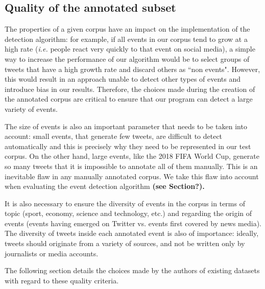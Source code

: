 \subsection{Quality of the annotated subset}

The properties of a given corpus have an impact on the implementation of the detection algorithm: for example, if all events in our corpus tend to grow at a high rate (\textit{i.e.} people react very quickly to that event on social media), a simple way to increase the performance of our algorithm would be to select groups of tweets that have a high growth rate and discard others as ``non events". However, this would result in an approach unable to detect other types of events and introduce bias in our results. Therefore, the choices made during the creation of the annotated corpus are critical to ensure that our program can detect a large variety of events.

The size of events is also an important parameter that needs to be taken into account: small events, that generate few tweets, are difficult to detect automatically and this is precisely why they need to be represented in our test corpus. On the other hand, large events, like the 2018 FIFA World Cup, generate so many tweets that it is impossible to annotate all of them manually. This is an inevitable flaw in any manually annotated corpus. We take this flaw into account when evaluating the event detection algorithm  \textbf{\color{orange}(see Section?).}

It is also necessary to ensure the diversity of events in the corpus in terms of topic (sport, economy, science and technology, etc.) and regarding the origin of events (events having emerged on Twitter vs. events first covered by news media). The diversity of tweets inside each annotated event is also of importance: ideally, tweets should originate from a variety of sources, and not be written only by journalists or media accounts.

The following section details the choices made by the authors of existing datasets with regard to these quality criteria.
        
		


